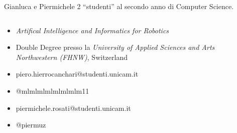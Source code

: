 \begin{frame}{Gianluca e Piermichele}
    2 ``studenti'' al secondo anno di Computer Science.
    \begin{columns}[t]
        \begin{column}{.5\textwidth}
          \begin{itemize}
            \item<1-> \textit{Artifical Intelligence and Informatics for Robotics}
            \item<2->[{\texttt{[image: img/swiss-flag.png]}}]  Double Degree presso la \textit{University of Applied Sciences and Arts Northwestern (FHNW)}, Switzerland
            \item<3->[{\texttt{[image: img/gmail-icon.png]}}]piero.hierrocanchari@studenti.unicam.it
            \item<3->[{\texttt{[image: img/telegram-logo.png]}}] @mlmlmlmlmlmlmlm11
            \vspace{0.2cm}
            \item<3->[{\texttt{[image: img/gmail-icon.png]}}] piermichele.rosati@studenti.unicam.it
            \item<3->[{\texttt{[image: img/telegram-logo.png]}}] @piermuz
          \end{itemize}
        \end{column}
        \begin{column}{.5\textwidth}
        \end{column}
      \end{columns}
    \end{frame}